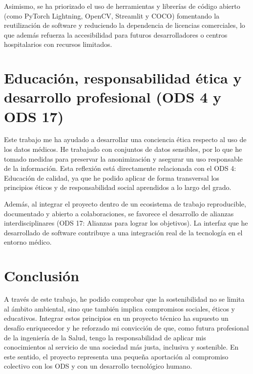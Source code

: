 Asimismo, se ha priorizado el uso de herramientas y librerías de código abierto (como PyTorch Lightning, OpenCV, Streamlit y COCO) fomentando la reutilización de software y reduciendo la dependencia de licencias comerciales, lo que además refuerza la accesibilidad para futuros desarrolladores o centros hospitalarios con recursos limitados.

\section{Educación, responsabilidad ética y desarrollo profesional (ODS 4 y ODS 17)}
Este trabajo me ha ayudado a desarrollar una conciencia ética respecto al uso de los datos médicos. He trabajado con conjuntos de datos sensibles, por lo que he tomado medidas para preservar la anonimización y asegurar un uso responsable de la información. Esta reflexión está directamente relacionada con el ODS 4: Educación de calidad, ya que he podido aplicar de forma transversal los principios éticos y de responsabilidad social aprendidos a lo largo del grado.

Además, al integrar el proyecto dentro de un ecosistema de trabajo reproducible, documentado y abierto a colaboraciones, se favorece el desarrollo de alianzas interdisciplinares (ODS 17: Alianzas para lograr los objetivos). La interfaz que he desarrollado de software contribuye a una integración real de la tecnología en el entorno médico.

\section{Conclusión}
A través de este trabajo, he podido comprobar que la sostenibilidad no se limita al ámbito ambiental, sino que también implica compromisos sociales, éticos y educativos. Integrar estos principios en un proyecto técnico ha supuesto un desafío enriquecedor y he reforzado mi convicción de que, como futura profesional de la ingeniería de la Salud, tengo la responsabilidad de aplicar mis conocimientos al servicio de una sociedad más justa, inclusiva y sostenible. En este sentido, el proyecto representa una pequeña aportación al compromiso colectivo con los ODS y con un desarrollo tecnológico humano.
